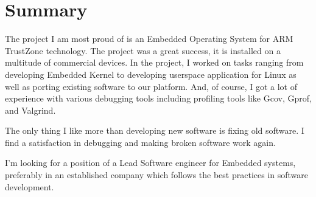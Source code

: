\documentclass[11pt,a4paper]{moderncv}
\title{\ml{Resume}{Резюме}}
\newif\ifenglish
\newcommand{\ml}[2]{\ifenglish#1\else#2\fi}
\begin{document}
\makecvtitle
\setlength{\hintscolumnwidth}{0.20\textwidth}

\def \YAR {\ml{Yaroslavl, Russia}{г. Ярославль}}
\def \MSK {\ml{Moscow}{Москва}}
\def \UNIV {\ml{Yaroslavl State University}{ЯРгУ им. П.Г. Демидова}}
\def \Samsung {\ml{Samsung R\&D Russia}{Исследовательский центр самсунг}}
\def \Samsunglogo {\\\texttt{[image: samsung.png]}}
\def \OpSy {OpenSynergy GmbH}
\def \BER {Berlin, Germany}

\section{Summary}
The project I am most proud of is an Embedded Operating System for ARM TrustZone technology. The project was a great success, it is installed on a multitude of commercial devices. In the project, I worked on tasks ranging from developing Embedded Kernel to developing userspace application for Linux as well as porting existing software to our platform. And, of course, I got a lot of experience with various debugging tools including profiling tools like Gcov, Gprof, and Valgrind.

The only thing I like more than developing new software is fixing old software. I find a satisfaction in debugging and making broken software work again.

I'm looking for a position of a Lead Software engineer for Embedded systems, preferably in an established company which follows the best practices in software development.
\end{document}
